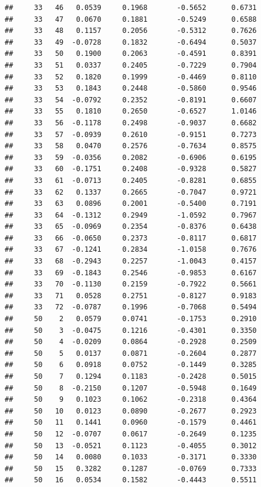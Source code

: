 \documentclass[
]{article}
\begin{document}
\begin{verbatim}
##     33   46   0.0539     0.1968       -0.5652      0.6731  
##     33   47   0.0670     0.1881       -0.5249      0.6588  
##     33   48   0.1157     0.2056       -0.5312      0.7626  
##     33   49  -0.0728     0.1832       -0.6494      0.5037  
##     33   50   0.1900     0.2063       -0.4591      0.8391  
##     33   51   0.0337     0.2405       -0.7229      0.7904  
##     33   52   0.1820     0.1999       -0.4469      0.8110  
##     33   53   0.1843     0.2448       -0.5860      0.9546  
##     33   54  -0.0792     0.2352       -0.8191      0.6607  
##     33   55   0.1810     0.2650       -0.6527      1.0146  
##     33   56  -0.1178     0.2498       -0.9037      0.6682  
##     33   57  -0.0939     0.2610       -0.9151      0.7273  
##     33   58   0.0470     0.2576       -0.7634      0.8575  
##     33   59  -0.0356     0.2082       -0.6906      0.6195  
##     33   60  -0.1751     0.2408       -0.9328      0.5827  
##     33   61  -0.0713     0.2405       -0.8281      0.6855  
##     33   62   0.1337     0.2665       -0.7047      0.9721  
##     33   63   0.0896     0.2001       -0.5400      0.7191  
##     33   64  -0.1312     0.2949       -1.0592      0.7967  
##     33   65  -0.0969     0.2354       -0.8376      0.6438  
##     33   66  -0.0650     0.2373       -0.8117      0.6817  
##     33   67  -0.1241     0.2834       -1.0158      0.7676  
##     33   68  -0.2943     0.2257       -1.0043      0.4157  
##     33   69  -0.1843     0.2546       -0.9853      0.6167  
##     33   70  -0.1130     0.2159       -0.7922      0.5661  
##     33   71   0.0528     0.2751       -0.8127      0.9183  
##     33   72  -0.0787     0.1996       -0.7068      0.5494  
##     50    2   0.0579     0.0741       -0.1753      0.2910  
##     50    3  -0.0475     0.1216       -0.4301      0.3350  
##     50    4  -0.0209     0.0864       -0.2928      0.2509  
##     50    5   0.0137     0.0871       -0.2604      0.2877  
##     50    6   0.0918     0.0752       -0.1449      0.3285  
##     50    7   0.1294     0.1183       -0.2428      0.5015  
##     50    8  -0.2150     0.1207       -0.5948      0.1649  
##     50    9   0.1023     0.1062       -0.2318      0.4364  
##     50   10   0.0123     0.0890       -0.2677      0.2923  
##     50   11   0.1441     0.0960       -0.1579      0.4461  
##     50   12  -0.0707     0.0617       -0.2649      0.1235  
##     50   13  -0.0521     0.1123       -0.4055      0.3012  
##     50   14   0.0080     0.1033       -0.3171      0.3330  
##     50   15   0.3282     0.1287       -0.0769      0.7333  
##     50   16   0.0534     0.1582       -0.4443      0.5511  

\end{verbatim}
\end{document}
